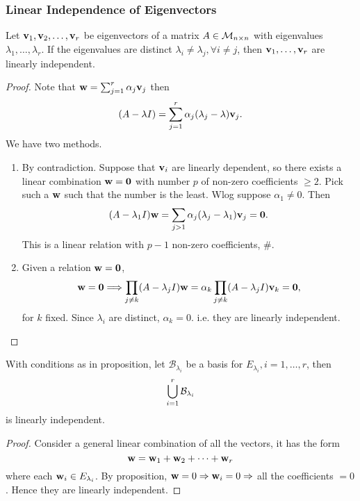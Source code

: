 \documentclass[10pt]{article}
\def\ge{\geqslant}
\begin{document}
    \subsubsection{Linear Independence of Eigenvectors}
    \begin{proposition}
        Let $ {\bf v}_1,{\bf v}_2,\dots, {\bf v}_r $ be eigenvectors of a matrix $A\in {\mathcal{M}}_{n\times n}$ with eigenvalues $ \lambda_1,\dots,\lambda_r $. If the eigenvalues are distinct $ \lambda_i\neq \lambda_j, \forall i\neq j $, then $ {\bf v}_1,\dots,{\bf v}_r $ are linearly independent.
    \end{proposition}
    \begin{proof}
        Note that $ {\bf w}=\sum_{j=1}^{r} \alpha_j {\bf v}_j $ then 
        \[
            (A-\lambda I)=\sum_{j=1}^{r} \alpha_j(\lambda_j-\lambda){\bf v}_j
        .\]
        We have two methods.
        \begin{enumerate}[align=hang,label=Method \arabic*.]
            \item By contradiction. Suppose that ${\bf v}_i$ are linearly dependent, so there exists a linear combination $ {\bf w}= \mathbf{0} $ with number $p$ of non-zero coefficients $ \ge 2 $. Pick such a ${\bf w}$ such that the number is the least. Wlog suppose $ \alpha_1 \neq 0$. Then 
            \[
                (A-\lambda_1 I){\bf w}= \sum_{j>1}\alpha_j(\lambda_j-\lambda_1 ){\bf v}_j=\mathbf{0}
            .\]
            This is a linear relation with $p-1$ non-zero coefficients, \#.
            \item Given a relation $ {\bf w}=\mathbf{0} $, 
            \[
                {\bf w}=\mathbf{0} \Longrightarrow \prod_{j\neq k}(A-\lambda_j I){\bf w}=\alpha_k\prod_{j\neq k}(A-\lambda_j I) {\bf v}_k=\mathbf{0}
            ,\]
            for $k$ fixed. Since $ \lambda_i $ are distinct, $ \alpha_k=0 $. i.e. they are linearly independent.
        \end{enumerate}
    \end{proof}
    \begin{corollary}
            With conditions as in proposition, let $ \mathcal{B}_{\lambda_i} $ be a basis for $ E_{\lambda_i},i=1,\dots,r $, then 
            \[
                \bigcup_{i=1}^{r} {\mathcal{B}}_{\lambda_i}
            \]
            is linearly independent.
    \end{corollary}
    \begin{proof}
        Consider a general linear combination of all the vectors, it has the form 
        \[
            {\bf w}={\bf w}_1+{\bf w}_2+ \cdots +{\bf w}_r
        \]
        where each ${\bf w}_i\in E_{\lambda_i}$. By proposition, $ {\bf w}=0 \Rightarrow {\bf w}_i=0 \Rightarrow  $ all the coefficients $=0$. Hence they are linearly independent.
    \end{proof}
\end{document}
